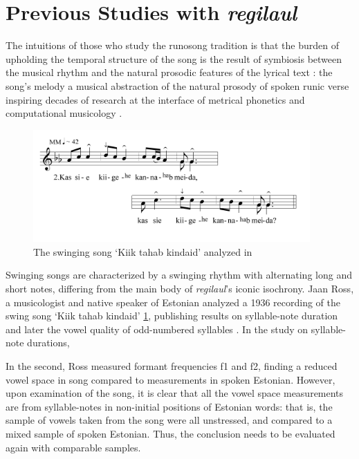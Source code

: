 \section{Previous Studies with {\it regilaul}}

The intuitions of those who study the runosong tradition is that the burden of upholding the temporal structure of the song is the result of symbiosis between the musical rhythm and the natural prosodic features of the lyrical text \citep{ross1992, tampere1934}: the song's melody a musical abstraction of the natural prosody of spoken runic verse 
inspiring decades of research at the interface of metrical phonetics and computational musicology \cite{ruutel1999}.
%
% 



\begin{figure}[htb]
\begin{center}
\includegraphics[width=300pt]{figures/022.png}
\caption{The swinging song `Kiik tahab kindaid' analyzed in \cite{ross1989,ross1992}}
\label{022swing}
\end{center}
\end{figure}

Swinging songs are characterized by a swinging rhythm with alternating long and short notes, differing from the main body of {\it regilaul}'s iconic isochrony. 
Jaan Ross, a musicologist and native speaker of Estonian analyzed a 1936 recording of the swing song `Kiik tahab kindaid' \ref{022swing}, publishing results on syllable-note duration \cite{ross1989} and later the vowel quality of odd-numbered syllables \citep{ross1992}. In the study on syllable-note durations, 

In the second, Ross measured formant frequencies f1 and f2, finding a reduced vowel space in song compared to measurements in spoken Estonian. However, upon examination of the song, it is clear that all the vowel space measurements are from syllable-notes in non-initial positions of Estonian words: that is, the sample of vowels taken from  the song were all unstressed, and compared to a mixed sample of spoken Estonian. Thus, the conclusion needs to be evaluated again with comparable samples. 

